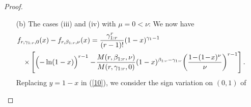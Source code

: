 \documentclass [11pt]{article}
\newcommand{\gos}{GOS}
\begin{document}
\begin{proof}
\begin{enumerate}
\begin{itemize}
    \smallskip
    
    Suppose now that $\frac{M(r,\gamma_{1:r},\mu)}{M(r,\beta_{1:r},\nu)}=1$. 
    Since $\gamma_{1:r} >\beta_{1:r}$, this implies that $\beta_{r:r} >
    \gamma_{r:r}$ and $\nu > \frac{\gamma_{1:r}-\beta_{1:r}}{r-1} +\mu$. 
    By the rule of signs, $h_1$ has sign variation in $\mathbb{R}_+$ either $-+$ or $-+-+$. When 
    $\frac{M(r,\gamma_{1:r},\mu)}{M(r,\beta_{1:r},\nu)}=1$, 
    then 
    \[
    h''_1(1) = -2  \frac{\gamma_{1:r}-\beta_{1:r}}{r-1} -\mu +\nu 
    =\frac{2}{r-1} \left( \frac{\beta_{1:r}+\beta_{r:r}}{2}-
    \frac{\gamma_{1:r}+\gamma_{r:r}}{2}\right).
    \]
    Consider increasing arithmetic vectors $(\alpha_{1:r},\ldots,
    \alpha_{r:r})$ such that the product of its positive coordinates has a fixed value. 
    One can see that increasing the common difference decreases the mean $\frac{\alpha_{1:r}+\alpha_{r:r}}{2}$. 
    Since $\nu >\mu$, we have $\frac{\beta_{1:r}+\beta_{r:r}}{2} < \frac{\gamma_{1:r}+\gamma_{r:r}}{2}$, and $h''_1(1)<0$ in 
    consequence. It means that both $-+$ and $-+-+$ are possible sign variations of $h_1$ in $(0,1)$. 
%    
    Suppose that the latter holds. It follows that (\ref{5}) is positive on some $(a,b)$ with $0<a<b<1$. 
    Slightly changing the parameters of $m$-\gos\ we violate the assumption $\frac{M(r,\gamma_{1:r},\mu)}{M(r,\beta_{1:r},\nu)}=1$ 
    and notice that $h_1$ is positive on some $(a',b')$ for some $0<a'<b'<1$. 
    This contradicts the hitherto established conclusions. 
    Therefore the sign variation of (\ref{5}) is $-+$ on the unit interval. This gives the desired claim in the case (i). %
    \end{itemize}
\item[(b)]
    The cases (iii) and (iv) %
    with $\mu=0 <\nu$: We now have
    \begin{eqnarray}
    \lefteqn{f_{r,\gamma_{1:r},0}(x) - f_{r,\beta_{1:r},\nu}(x) =
    \frac{\gamma_{1:r}^r}{(r-1)!}(1-x)^{\gamma_1-1} } \nonumber \\
    & & \times \left[\Bigl( -\ln (1-x)\Bigr)^{r-1}
    - \! \frac{M(r,\beta_{1:r},\nu)}{M(r,\gamma_{1:r},0)}
    (1-x)^{\beta_{1:r}-\gamma_{1:r}}\!\left( \frac{1\!-\!(1\!-\!x)^\nu}{\nu}\right)^{r-1}\right].\qquad
    \label{10}
    \end{eqnarray}
Replacing $y=1-x$ in (\ref{10}), we consider the sign variation on $(0,1)$ of
%
\begin{equation}

\end{equation}
\end{enumerate}
\end{proof}
\end{document}
